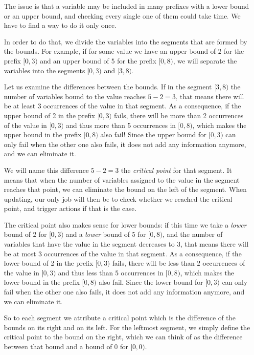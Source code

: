 \documentclass[a4paper,10pt]{article}
\begin{document}
The issue is that a variable may be included in many prefixes with a lower bound or an upper bound, and checking every single one of them could take time. We have to find a way to do it only once.

In order to do that, we divide the variables into the segments that are formed by the bounds. For example, if for some value we have an upper bound of 2 for the prefix $[0,3)$ and an upper bound of 5 for the prefix $[0,8)$, we will separate the variables into the segments $[0,3)$ and $[3,8)$.

Let us examine the differences between the bounds. If in the segment $[3,8)$ the number of variables bound to the value reaches $5-2=3$, that means there will be at least 3 occurrences of the value in that segment. As a consequence, if the upper bound of 2 in the prefix $[0,3)$ fails, there will be more than 2 occurrences of the value in $[0,3)$ and thus more than 5 occurrences in $[0,8)$, which makes the upper bound in the prefix $[0,8)$ also fail! Since the upper bound for $[0,3)$ can only fail when the other one also fails, it does not add any information anymore, and we can eliminate it.

We will name this difference $5-2=3$ the \emph{critical point} for that segment. It means that when the number of variables assigned to the value in the segment reaches that point, we can eliminate the bound on the left of the segment. When updating, our only job will then be to check whether we reached the critical point, and trigger actions if that is the case.

The critical point also makes sense for lower bounds: if this time we take a \emph{lower} bound of 2 for $[0,3)$ and a \emph{lower} bound of 5 for $[0,8)$, and the number of variables that have the value in the segment decreases to 3, that means there will be at most 3 occurrences of the value in that segment. As a consequence, if the lower bound of 2 in the prefix $[0,3)$ fails, there will be less than 2 occurrences of the value in $[0,3)$ and thus less than 5 occurrences in $[0,8)$, which makes the lower bound in the prefix $[0,8)$ also fail. Since the lower bound for $[0,3)$ can only fail when the other one also fails, it does not add any information anymore, and we can eliminate it.

So to each segment we attribute a critical point which is the difference of the bounds on its right and on its left. For the leftmost segment, we simply define the critical point to the bound on the right, which we can think of as the difference between that bound and a bound of 0 for $[0,0)$.
\end{document}

